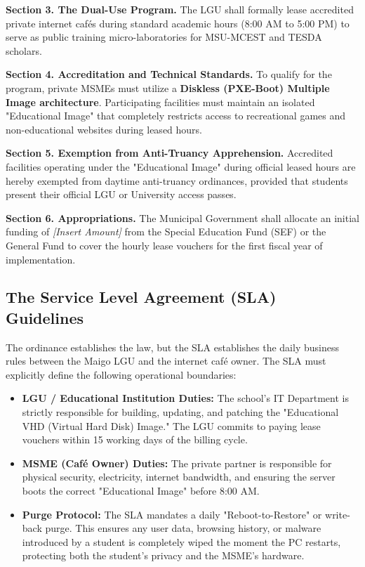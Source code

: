 \noindent \textbf{Section 3. The Dual-Use Program.} The LGU shall formally lease accredited private internet cafés during standard academic hours (8:00 AM to 5:00 PM) to serve as public training micro-laboratories for MSU-MCEST and TESDA scholars. 

\noindent \textbf{Section 4. Accreditation and Technical Standards.} To qualify for the program, private MSMEs must utilize a \textbf{Diskless (PXE-Boot) Multiple Image architecture}. Participating facilities must maintain an isolated "Educational Image" that completely restricts access to recreational games and non-educational websites during leased hours.

\noindent \textbf{Section 5. Exemption from Anti-Truancy Apprehension.} Accredited facilities operating under the "Educational Image" during official leased hours are hereby exempted from daytime anti-truancy ordinances, provided that students present their official LGU or University access passes.

\noindent \textbf{Section 6. Appropriations.} The Municipal Government shall allocate an initial funding of \textit{[Insert Amount]} from the Special Education Fund (SEF) or the General Fund to cover the hourly lease vouchers for the first fiscal year of implementation.

\subsection{The Service Level Agreement (SLA) Guidelines}
The ordinance establishes the law, but the SLA establishes the daily business rules between the Maigo LGU and the internet café owner. The SLA must explicitly define the following operational boundaries:

\begin{itemize}
    \item \textbf{LGU / Educational Institution Duties:} The school's IT Department is strictly responsible for building, updating, and patching the "Educational VHD (Virtual Hard Disk) Image." The LGU commits to paying lease vouchers within 15 working days of the billing cycle.
    \item \textbf{MSME (Café Owner) Duties:} The private partner is responsible for physical security, electricity, internet bandwidth, and ensuring the server boots the correct "Educational Image" before 8:00 AM. 
    \item \textbf{Purge Protocol:} The SLA mandates a daily "Reboot-to-Restore" or write-back purge. This ensures any user data, browsing history, or malware introduced by a student is completely wiped the moment the PC restarts, protecting both the student's privacy and the MSME's hardware.
\end{itemize}

